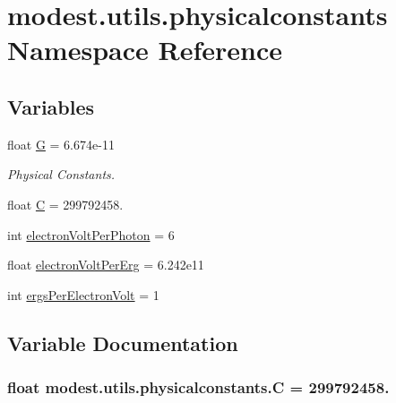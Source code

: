 \hypertarget{namespacemodest_1_1utils_1_1physicalconstants}{}\section{modest.\+utils.\+physicalconstants Namespace Reference}
\label{namespacemodest_1_1utils_1_1physicalconstants}
\subsection*{Variables}
\begin{DoxyCompactItemize}
\item 
float \hyperlink{namespacemodest_1_1utils_1_1physicalconstants_a4dbf6992bb8dc7fb3f56e2c16f6a44f6}{G} = 6.\+674e-\/11
\begin{DoxyCompactList}\small\item\em Physical Constants. \end{DoxyCompactList}\item 
float \hyperlink{namespacemodest_1_1utils_1_1physicalconstants_ab2e40332df353f2812f73c6cb9782903}{C} = 299792458.
\item 
int \hyperlink{namespacemodest_1_1utils_1_1physicalconstants_a5de6a1f36432c45571ffb47ac2f9363a}{electron\+Volt\+Per\+Photon} = 6
\item 
float \hyperlink{namespacemodest_1_1utils_1_1physicalconstants_ae4bd0051685a48d01b60178bf81e217a}{electron\+Volt\+Per\+Erg} = 6.\+242e11
\item 
int \hyperlink{namespacemodest_1_1utils_1_1physicalconstants_ad65e050e106abd959ed2133d5d10480f}{ergs\+Per\+Electron\+Volt} = 1
\end{DoxyCompactItemize}


\subsection{Variable Documentation}
\subsubsection[{\texorpdfstring{C}{C}}]{\setlength{\rightskip}{0pt plus 5cm}float modest.\+utils.\+physicalconstants.\+C = 299792458.}\hypertarget{namespacemodest_1_1utils_1_1physicalconstants_ab2e40332df353f2812f73c6cb9782903}{}\label{namespacemodest_1_1utils_1_1physicalconstants_ab2e40332df353f2812f73c6cb9782903}


